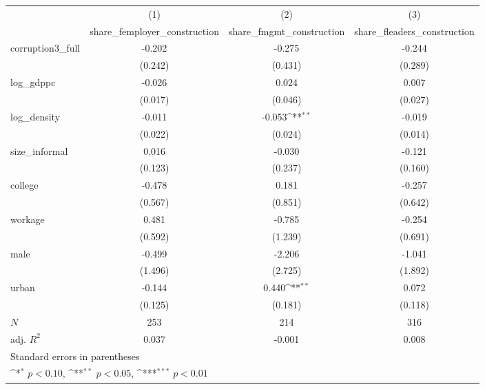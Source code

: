 {
\def\sym#1{\ifmmode^{#1}\else\(^{#1}\)\fi}
\begin{tabular}{l*{3}{c}}
\hline\hline
            &\multicolumn{1}{c}{(1)}&\multicolumn{1}{c}{(2)}&\multicolumn{1}{c}{(3)}\\
            &\multicolumn{1}{c}{share\_femployer\_construction}&\multicolumn{1}{c}{share\_fmgmt\_construction}&\multicolumn{1}{c}{share\_fleaders\_construction}\\
\hline
corruption3\_full&      -0.202         &      -0.275         &      -0.244         \\
            &     (0.242)         &     (0.431)         &     (0.289)         \\
[1em]
log\_gdppc   &      -0.026         &       0.024         &       0.007         \\
            &     (0.017)         &     (0.046)         &     (0.027)         \\
[1em]
log\_density &      -0.011         &      -0.053\sym{**} &      -0.019         \\
            &     (0.022)         &     (0.024)         &     (0.014)         \\
[1em]
size\_informal&       0.016         &      -0.030         &      -0.121         \\
            &     (0.123)         &     (0.237)         &     (0.160)         \\
[1em]
college     &      -0.478         &       0.181         &      -0.257         \\
            &     (0.567)         &     (0.851)         &     (0.642)         \\
[1em]
workage     &       0.481         &      -0.785         &      -0.254         \\
            &     (0.592)         &     (1.239)         &     (0.691)         \\
[1em]
male        &      -0.499         &      -2.206         &      -1.041         \\
            &     (1.496)         &     (2.725)         &     (1.892)         \\
[1em]
urban       &      -0.144         &       0.440\sym{**} &       0.072         \\
            &     (0.125)         &     (0.181)         &     (0.118)         \\
\hline
\(N\)       &         253         &         214         &         316         \\
adj. \(R^{2}\)&       0.037         &      -0.001         &       0.008         \\
\hline\hline
\multicolumn{4}{l}{\footnotesize Standard errors in parentheses}\\
\multicolumn{4}{l}{\footnotesize \sym{*} \(p<0.10\), \sym{**} \(p<0.05\), \sym{***} \(p<0.01\)}\\
\end{tabular}
}
